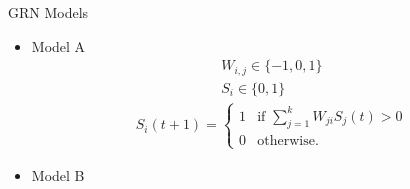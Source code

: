 \begin{frame}{GRN Models}
  \begin{itemize}
    \item Model A \cite{Wilder2015ReconcilingEvolvability}
	 \begin{align*}
    	W_{i,j} \in \{-1,0,1\} \\
        S_i \in \{0,1\}
    \end{align*}
    \begin{align*}
    S_i(t+1) = 
      \begin{cases}
      1 & \text{if } \sum_{j=1}^{k} W_{ji}S_j(t) > 0 \\
      0 & \text{otherwise.}
      \end{cases}
    \end{align*}
    \item Model B \cite{Kuo2006NetworkDivergence}
  \end{itemize}
\end{frame}